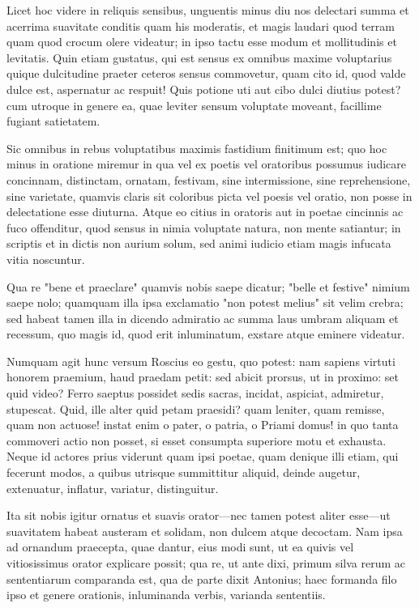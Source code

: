  Licet hoc videre in reliquis sensibus, unguentis minus diu nos delectari summa et acerrima suavitate conditis quam his moderatis, et magis laudari quod terram quam quod crocum olere videatur; in ipso tactu esse modum et mollitudinis et levitatis. Quin etiam gustatus, qui est sensus ex omnibus maxime voluptarius quique dulcitudine praeter ceteros sensus commovetur, quam cito id, quod valde dulce est, aspernatur ac respuit! Quis potione uti aut cibo dulci diutius potest? cum utroque in genere ea, quae leviter sensum voluptate moveant, facillime fugiant satietatem.

 Sic omnibus in rebus voluptatibus maximis fastidium finitimum est; quo hoc minus in oratione miremur in qua vel ex poetis vel oratoribus possumus iudicare concinnam, distinctam, ornatam, festivam, sine intermissione, sine reprehensione, sine varietate, quamvis claris sit coloribus picta vel poesis vel oratio, non posse in delectatione esse diuturna. Atque eo citius in oratoris aut in poetae cincinnis ac fuco offenditur, quod sensus in nimia voluptate natura, non mente satiantur; in scriptis et in dictis non aurium solum, sed animi iudicio etiam magis infucata vitia noscuntur.

 Qua re "bene et praeclare" quamvis nobis saepe dicatur; "belle et festive" nimium saepe nolo; quamquam illa ipsa exclamatio "non potest melius" sit velim crebra; sed habeat tamen illa in dicendo admiratio ac summa laus umbram aliquam et recessum, quo magis id, quod erit inluminatum, exstare atque eminere videatur.

 Numquam agit hunc versum Roscius eo gestu, quo potest: nam sapiens virtuti honorem praemium, haud praedam petit: sed abicit prorsus, ut in proximo: set quid video? Ferro saeptus possidet sedis sacras, incidat, aspiciat, admiretur, stupescat. Quid, ille alter quid petam praesidi? quam leniter, quam remisse, quam non actuose! instat enim o pater, o patria, o Priami domus! in quo tanta commoveri actio non posset, si esset consumpta superiore motu et exhausta. Neque id actores prius viderunt quam ipsi poetae, quam denique illi etiam, qui fecerunt modos, a quibus utrisque summittitur aliquid, deinde augetur, extenuatur, inflatur, variatur, distinguitur.

 Ita sit nobis igitur ornatus et suavis orator—nec tamen potest aliter esse—ut suavitatem habeat austeram et solidam, non dulcem atque decoctam. Nam ipsa ad ornandum praecepta, quae dantur, eius modi sunt, ut ea quivis vel vitiosissimus orator explicare possit; qua re, ut ante dixi, primum silva rerum ac sententiarum comparanda est, qua de parte dixit Antonius; haec formanda filo ipso et genere orationis, inluminanda verbis, varianda sententiis.

